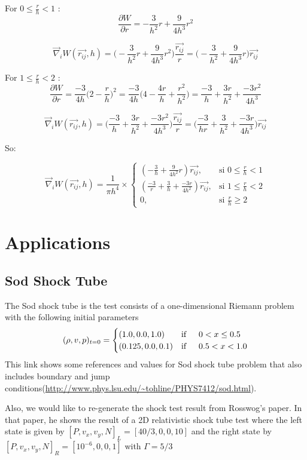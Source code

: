 \documentclass{article}
\begin{document}
For $0 \leq \frac{r}{h} < 1$ :
$$ \frac{\partial W}{\partial r} = - \frac{3}{h^2}r + \frac{9}{4h^3}r^2$$

$$ \vec{\nabla}_iW(\vec{r_{ij}},h) =\Big( -\frac{3}{h^2}r + \frac{9}{4h^3}r^2\Big) \frac{\vec{r_{ij}}}{r} = \Big( -\frac{3}{h^2} + \frac{9}{4h^3}r\Big) \vec{r_{ij}} $$

For $1 \leq \frac{r}{h} < 2$ :
$$ \frac{\partial W}{\partial r} = \frac{-3}{4h} \Big(2-\frac{r}{h}\Big)^2 = \frac{-3}{4h} \Big( 4 - \frac{4r}{h} + \frac{r^2}{h^2} \Big) = \frac{-3}{h} + \frac{3r}{h^2} + \frac{-3r^2}{4h^3}$$

$$ \vec{\nabla}_iW(\vec{r_{ij}},h) =\Big(\frac{-3}{h} + \frac{3r}{h^2} + \frac{-3r^2}{4h^3} \Big) \frac{\vec{r_{ij}}}{r} = \Big(\frac{-3}{hr} + \frac{3}{h^2} + \frac{-3r}{4h^3} \Big) \vec{r_{ij}}  $$

So:

$$
 \vec{\nabla}_iW(\vec{r_{ij}},h) = \frac{1}{\pi h^4} \times \begin{cases} ( -\frac{3}{h} + \frac{9}{4h^2}r) \vec{r_{ij}}, & \mbox{si } 0 \leq \frac{r}{h} < 1 \\ (\frac{-3}{r} + \frac{3}{h} + \frac{-3r}{4h^2} ) \vec{r_{ij}}, & \mbox{si } 1 \leq \frac{r}{h} < 2\\ 0, & \mbox{si } \frac{r}{h} \geq 2 \end{cases}$$

\section{Applications}

\subsection{Sod Shock Tube}
The Sod shock tube is the test consists of a one-dimensional Riemann problem with the following initial parameters
\begin{equation}
(\rho, v, p)_{t=0} = \begin{cases}
(1.0,0.0,1.0) & \text{if} \indent 0 < x \leq 0.5 \\
(0.125,0.0,0.1) & \text{if} \indent 0.5 < x < 1.0
\end{cases}
\end{equation}
This link shows some references and values for Sod shock tube problem that also includes boundary and jump conditions(\url{http://www.phys.lsu.edu/~tohline/PHYS7412/sod.html}).

Also, we would like to re-generate the shock test result from Rosswog's paper. In that paper, he shows the result of a 2D relativistic shock tube test where the left state is given by $[P, v_x, v_y, N]_L = [40/3,0,0,10]$ and the right state by $[P, v_x, v_y, N]_R = [10^{-6},0,0,1]$ with $\Gamma = 5/3$
\end{document}
